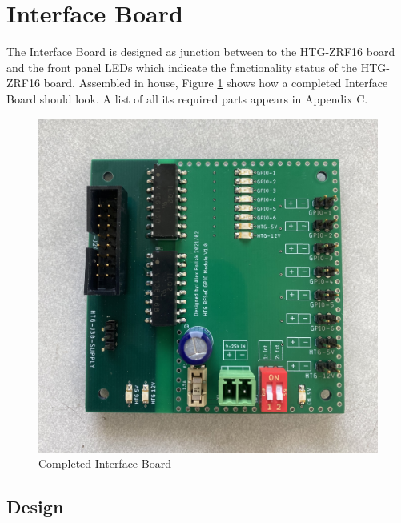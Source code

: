 \documentclass[12pt,a4paper,oneside]{article}
\begin{document}

\section{Interface Board}
\label{sec:4}

The Interface Board is designed as junction between to the HTG-ZRF16 board and the front panel LEDs which indicate the functionality status of the HTG-ZRF16 board. Assembled in house, Figure \ref{fig:Interface_Board} shows how a completed Interface Board should look. A list of all its required parts appears in Appendix C. 

%
\begin{figure}[H]
\centering
\includegraphics[width=1\linewidth]{figures/Interface_Board.jpeg}
\caption{Completed Interface Board}
\label{fig:Interface_Board}
\end{figure}
%

\subsection{Design}
\label{sec:4.1}
\end{document}
